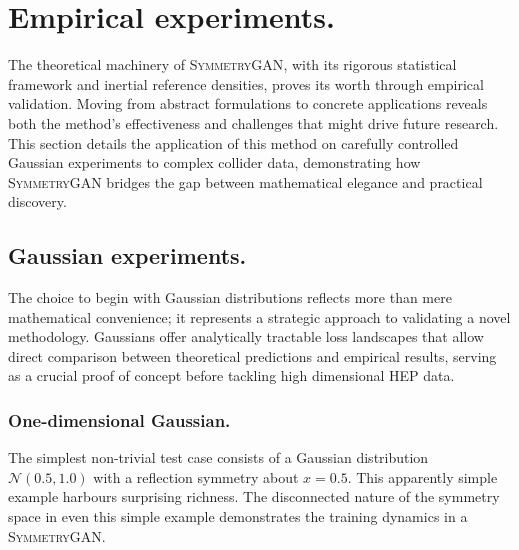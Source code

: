 \section{Empirical experiments.}
\label{sec:empirical-experiments}
        The theoretical machinery of \textsc{SymmetryGAN}, with its rigorous statistical framework and inertial reference densities, proves its worth through empirical validation.
        Moving from abstract formulations to concrete applications reveals both the method's effectiveness and challenges that might drive future research.
        This section details the application of this method on carefully controlled Gaussian experiments to complex collider data, demonstrating how \textsc{SymmetryGAN} bridges the gap between mathematical elegance and practical discovery.

        \subsection{Gaussian experiments.}
            The choice to begin with Gaussian distributions reflects more than mere mathematical convenience; it represents a strategic approach to validating a novel methodology.
            Gaussians offer analytically tractable loss landscapes that allow direct comparison between theoretical predictions and empirical results, serving as a crucial proof of concept before tackling high dimensional HEP data.

            \subsubsection{One-dimensional Gaussian.}
                The simplest non-trivial test case consists of a Gaussian distribution \(\mathcal{N}(0.5,1.0)\) with a reflection symmetry about \(x=0.5\).
                This apparently simple example harbours surprising richness.
                The disconnected nature of the symmetry space in even this simple example demonstrates the training dynamics in a \textsc{SymmetryGAN.}

